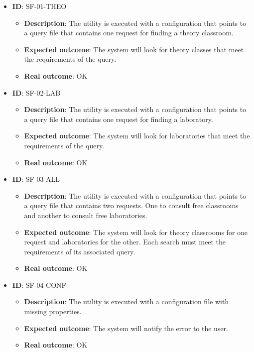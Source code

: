 \begin{itemize}
    \item \textbf{ID}: SF-01-THEO
        \begin{itemize}
            \item \textbf{Description}: The utility is executed with a configuration that points to a query file that contains one request for finding a theory classroom.
            \item \textbf{Expected outcome}: The system will look for theory classes that meet the requirements of the query.
            \item \textbf{Real outcome}: OK
        \end{itemize}
    \item \textbf{ID}: SF-02-LAB
        \begin{itemize}
            \item \textbf{Description}: The utility is executed with a configuration that points to a query file that contains one request for finding a laboratory.
            \item \textbf{Expected outcome}: The system will look for laboratories that meet the requirements of the query.
            \item \textbf{Real outcome}: OK
        \end{itemize}
    \item \textbf{ID}: SF-03-ALL
        \begin{itemize}
            \item \textbf{Description}: The utility is executed with a configuration that points to a query file that contains two requests. One to consult free classrooms and another to consult free laboratories. 
            \item \textbf{Expected outcome}: The system will look for theory classrooms for one request and laboratories for the other. Each search must meet the requirements of its associated query.
            \item \textbf{Real outcome}: OK
        \end{itemize}
    \item \textbf{ID}: SF-04-CONF
        \begin{itemize}
            \item \textbf{Description}: The utility is executed with a configuration file with missing properties.
            \item \textbf{Expected outcome}: The system will notify the error to the user.
            \item \textbf{Real outcome}: OK

\end{itemize}
\end{itemize}
